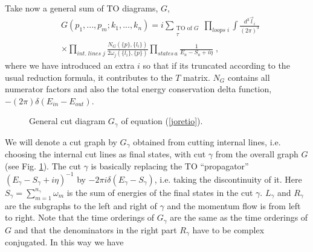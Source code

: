 \documentclass[%
 reprint,
 amsmath,amssymb,
 aps,
]{revtex4-1}
\begin{document}
Take now a general sum of TO diagrams, $G$,
\begin{align}
&G(p_1,...,p_m;k_1,...,k_n)=i\sum_{\substack{\text{TO of $G$} \\ \tau}}\prod_{loops\;i}\int\frac{d^3\vec{l}_i}{(2\pi)^3}\nonumber\\
&\times\prod_{int.\;lines\;j}\frac{N_G(\{p\},\{l_i\})}{2\omega_j(\{l_i\},\{p\})}\prod_{states\,a}\frac{1}{E_a-S_a+i\eta}\label{kinoto}\;,
\end{align}
where we have introduced an extra $i$ so that if its truncated according to the usual reduction formula, it contributes to the $T$ matrix. $N_G$ contains all numerator factors and also the total energy conservation delta function, $-(2\pi)\delta(E_{in}-E_{out})$.
\begin{figure}[ht!]
\centering
{}
\caption{General cut diagram $G_\gamma$ of equation (\ref{joretio}).}\label{kaka}
\end{figure}
We will denote a cut graph by $G_\gamma$ obtained from cutting internal lines, i.e. choosing the internal cut lines as final states, with cut $\gamma$ from the overall graph $G$ (see Fig. \ref{kaka}). The cut $\gamma$ is basically replacing the TO ``propagator'' $(E_\gamma-S_\gamma+i\eta)^{-1}$ by $-2\pi i \delta(E_\gamma-S_\gamma)$, i.e. taking the discontinuity of it. Here $S_\gamma=\sum_{m=1}^{n_\gamma}\omega_m$ is the sum of energies of the final states in the cut $\gamma$. $L_\gamma$ and $R_\gamma$ are the subgraphs to the left and right of $\gamma$ and the momentum flow is from left to right. Note that the time orderings of $G_\gamma$ are the same as the time orderings of $G$ and that the denominators in the right part $R_\gamma$ have to be complex conjugated. In this way we have
\end{document}
